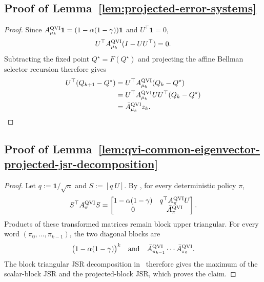\documentclass[letterpaper]{article}
\numberwithin{equation}{section}
\begin{document}
\subsection{Proof of Lemma~\ref{lem:projected-error-systems}}
\label{app:proof-lem-projected-error-systems}

\begin{proof}
Since $A_{\mu_k}^{\rm QVI}\mathbf{1}=(1-\alpha(1-\gamma))\mathbf{1}$ and
$U^\top\mathbf{1}=0$,
\begin{align*}
  U^\top A_{\mu_k}^{\rm QVI}(I-UU^\top)=0.
\end{align*}
Subtracting the fixed point $Q^\star=F(Q^\star)$ and projecting the affine
Bellman selector recursion therefore gives
\begin{align*}
  U^\top(Q_{k+1}-Q^\star)
  &=U^\top A_{\mu_k}^{\rm QVI}(Q_k-Q^\star)\\
  &=U^\top A_{\mu_k}^{\rm QVI}UU^\top(Q_k-Q^\star)\\
  &=\bar A_{\mu_k}^{\rm QVI}z_k.
\end{align*}
\end{proof}

\subsection{Proof of Lemma~\ref{lem:qvi-common-eigenvector-projected-jsr-decomposition}}
\label{app:proof-lem-qvi-common-eigenvector-projected-jsr-decomposition}

\begin{proof}
Let $q:=\mathbf{1}/\sqrt n$ and $S:=[q\ U]$. By
, for every deterministic
policy $\pi$,
\begin{align*}
  S^\top A_\pi^{\rm QVI}S
  =
  \begin{bmatrix}
    1-\alpha(1-\gamma)&q^\top A_\pi^{\rm QVI}U\\
    0&\bar A_\pi^{\rm QVI}
  \end{bmatrix}.
\end{align*}
Products of these transformed matrices remain block upper triangular. For every
word $(\pi_0,\ldots,\pi_{k-1})$, the two diagonal blocks are
\begin{align*}
  \bigl(1-\alpha(1-\gamma)\bigr)^k
  \quad\text{and}\quad
  \bar A_{\pi_{k-1}}^{\rm QVI}\cdots\bar A_{\pi_0}^{\rm QVI}.
\end{align*}
The block triangular JSR decomposition in~
therefore gives the maximum of the scalar-block JSR and the projected-block JSR,
which proves the claim.
\end{proof}
\end{document}
